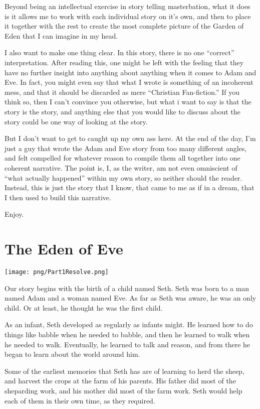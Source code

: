 \documentclass[12pt,twoside,titlepage]{report}
\begin{document}
Beyond being an intellectual exercise in story telling masterbation,
what it does is it allows me to work with each individual story on it's
own, and then to place it together with the rest to create the most
complete picture of the Garden of Eden that I can imagine in my head.

I also want to make one thing clear. In this story, there is no one
``correct'' interpretation. After reading this, one might be left with
the feeling that they have no further insight into anything about
anything when it comes to Adam and Eve. In fact, you might even say that
what I wrote is something of an incoherent mess, and that it should be
discarded as mere ``Christian Fan-fiction.'' If you think so, then I
can't convince you otherwise, but what i want to say is that the story
is the story, and anything else that you would like to discuss about the
story could be one way of looking at the story.

But I don't want to get to caught up my own ass here. At the end of the
day, I'm just a guy that wrote the Adam and Eve story from too many
different angles, and felt compelled for whatever reason to compile them
all together into one coherent narrative. The point is, I, as the
writer, am not even omniscient of ``what actually happened'' within my
own story, so neither should the reader. Instead, this is just the story
that I know, that came to me as if in a dream, that I then used to build
this narrative.

Enjoy.

\hypertarget{the-eden-of-eve}{%
\chapter{The Eden of Eve}\label{the-eden-of-eve}}

\texttt{[image: png/Part1Resolve.png]}

Our story begins with the birth of a child named Seth. Seth was born to
a man named Adam and a woman named Eve. As far as Seth was aware, he was
an only child. Or at least, he thought he was the first child.

As an infant, Seth developed as regularly as infants might. He learned
how to do things like babble when he needed to babble, and then he
learned to walk when he needed to walk. Eventually, he learned to talk
and reason, and from there he began to learn about the world around him.

Some of the earliest memories that Seth has are of learning to herd the
sheep, and harvest the crops at the farm of his parents. His father did
most of the sheparding work, and his mother did most of the farm work.
Seth would help each of them in their own time, as they required.
\end{document}
